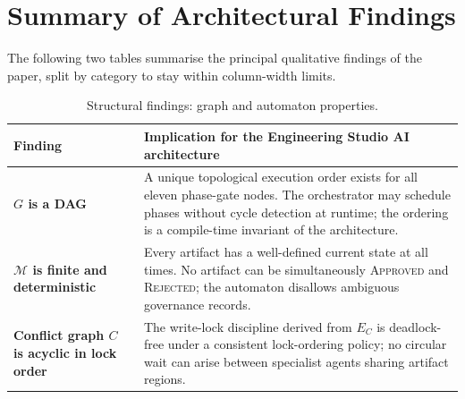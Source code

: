 \documentclass[12pt]{article}
\theoremstyle{definition}
\begin{document}
\section{Summary of Architectural Findings}
\label{app:findings}

\noindent The following two tables summarise the principal qualitative
findings of the paper, split by category to stay within column-width limits.

\begin{table}[H]
\centering
\caption{Structural findings: graph and automaton properties.}
\label{tab:findings-structural}
\begin{tabularx}{\linewidth}{@{}>{\bfseries\RaggedRight}p{3.6cm} X@{}}
\toprule
Finding & Implication for the Engineering Studio AI architecture \\
\midrule
$G$ is a DAG &
  A unique topological execution order exists for all eleven
  phase-gate nodes.  The orchestrator may schedule phases without
  cycle detection at runtime; the ordering is a compile-time invariant
  of the architecture. \\[4pt]
$\mathcal{M}$ is finite and deterministic &
  Every artifact has a well-defined current state at all times.  No
  artifact can be simultaneously \textsc{Approved} and
  \textsc{Rejected}; the automaton disallows ambiguous governance
  records. \\[4pt]
Conflict graph $C$ is acyclic in lock order &
  The write-lock discipline derived from $E_C$ is deadlock-free under
  a consistent lock-ordering policy; no circular wait can arise between
  specialist agents sharing artifact regions. \\
\bottomrule
\end{tabularx}
\end{table}
\end{document}
